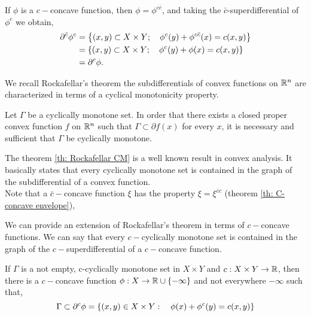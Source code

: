 If $\phi$ is a $c-$concave function, then $\phi=\phi^{c\bar c}$, and taking the $\bar c$-superdifferential of $\phi^{c}$ we obtain,
\begin{align*}
	\partial^{\bar c}\phi^c &=\left\lbrace (x, y)\subset X\times Y;\quad \phi^c(y)+\phi^{c\bar c}(x)=c(x,y) \right\rbrace\\
	&=\left\lbrace (x, y)\subset X\times Y;\quad \phi^c(y)+\phi(x)=c(x,y) \right\rbrace\\
	&=\partial^{c}\phi.
\end{align*}  

We recall Rockafellar's theorem the subdifferentials  of convex functions on $\mathbb{R}^n$ are characterized in terms of a cyclical monotonicity property.

\begin{theorem}[Rockafellar]
	\label{th: Rockafellar CM}
	Let $\Gamma$ be a cyclically monotone set. In order that there exists a closed proper convex function $f$ on $\mathbb{R}^n$ such that $\Gamma \subset \partial f(x) $ for  every $x$, it is necessary and sufficient that $\Gamma$ be cyclically monotone. 
\end{theorem}

The theorem \ref{th: Rockafellar CM} is a well known result in convex analysis. It basically states that every cyclically monotone set is contained in the graph of the subdifferential of a convex function.\\
Note that a $\bar c-$concave function $\xi$ has the property $\xi=\xi^{\bar c c}$ (theorem \ref{th: C-concave envelope}), 

We can provide an extension of Rockafellar's theorem in terms of $c-$concave functions. We can say that every $c-$cyclically monotone set is contained in the graph of the $c-$superdifferential of a $c-$concave function. 

\begin{theorem}
	If $\Gamma$ is a not empty, c-cyclically monotone set in $X\times Y$ and $c:X\times Y \rightarrow \mathbb{R}$, then there is a $c-$concave function $\phi:X\rightarrow \mathbb{R}\cup\left\lbrace -\infty \right\rbrace$ and not everywhere $-\infty$ such that,
	\begin{equation}
		\Gamma\subset\partial^c\phi=\left\lbrace (x,y)\in X\times Y:\quad \phi(x)+\phi^c(y)=c(x,y) \right\rbrace
	\end{equation}
	\label{th: c-cyclically in superdifferential}
\end{theorem}

